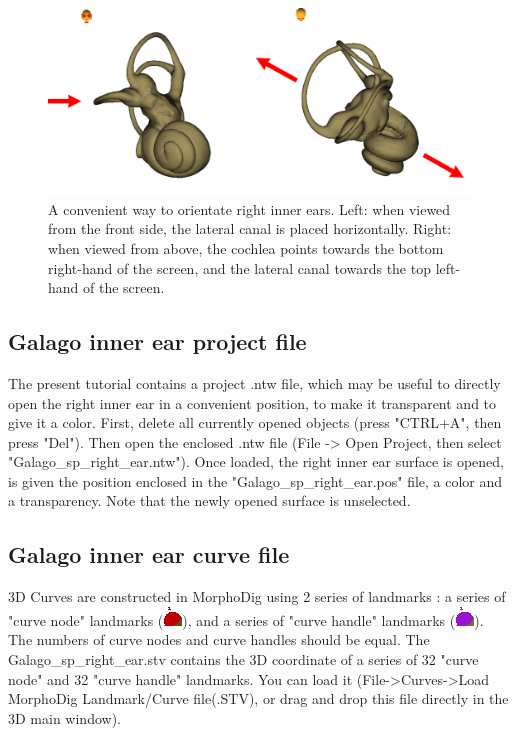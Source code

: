 \documentclass[12pt, a4paper]{book}
\begin{document}
\begin{figure}
  \centering
  \includegraphics[scale=0.3]{pos.png} 
	\caption{A convenient way to orientate right inner ears.  Left: when viewed from the front side, the lateral canal is placed horizontally. Right: when viewed from above, the cochlea points towards the bottom right-hand of the screen, and the lateral canal towards the top left-hand of the screen.}
\label{orientation}
 
\end{figure}


\subsection{Galago inner ear project file}
The present tutorial contains a project .ntw file, which may be useful to directly open the right inner ear
 in a convenient position, to make it transparent and to give it a color. First, delete all currently opened objects
(press "CTRL+A", then press "Del"). Then open the enclosed .ntw file (File -> Open Project, then select
"Galago\_sp\_right\_ear.ntw"). Once loaded, the right inner ear surface is opened, is given the position
enclosed in the "Galago\_sp\_right\_ear.pos" file, a color and a transparency. Note that the newly opened
surface is unselected.\\

\subsection{Galago inner ear curve file}
3D Curves are constructed in MorphoDig using 2 series of landmarks : a series of "curve node" landmarks (\includegraphics[scale=0.7]{../images/04/curve_nodes.png}),
and a series of "curve handle" landmarks (\includegraphics[scale=0.7]{../images/04/curve_handles.png}). The numbers of curve nodes and curve handles should be equal. The Galago\_sp\_right\_ear.stv contains the 3D coordinate of a series of  32 "curve node" and 32 "curve handle" landmarks. You can load it (File->Curves->Load MorphoDig Landmark/Curve file(.STV), or drag and drop this file directly in the 3D main window).\\
\end{document}
